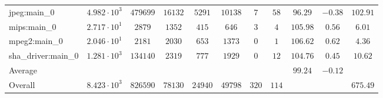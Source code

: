 \begin{tabular}{|l|c|c|c|c|c|c|c|c|c|c|}
jpeg:main\_0            & $ 4.982 \cdot 10^{3} $ & $ 479699 $ & $ 16132 $ & $ 5291  $ & $ 10138 $ & $ 7   $ & $ 58  $ & $ 96.29       $ & $ -0.38   $ & $ 102.91  $ \\
mips:main\_0            & $ 2.717 \cdot 10^{1} $ & $ 2879   $ & $ 1352  $ & $ 415   $ & $ 646   $ & $ 3   $ & $ 4   $ & $ 105.98      $ & $ 0.56    $ & $ 6.01    $ \\
mpeg2:main\_0           & $ 2.046 \cdot 10^{1} $ & $ 2181   $ & $ 2030  $ & $ 653   $ & $ 1373  $ & $ 0   $ & $ 1   $ & $ 106.62      $ & $ 0.62    $ & $ 4.36    $ \\
sha\_driver:main\_0     & $ 1.281 \cdot 10^{3} $ & $ 134140 $ & $ 2319  $ & $ 777   $ & $ 1929  $ & $ 0   $ & $ 12  $ & $ 104.76      $ & $ 0.45    $ & $ 10.62   $ \\
\hline
Average                 & $                    $ & $        $ & $       $ & $       $ & $       $ & $     $ & $     $ & $ 99.24       $ & $ -0.12   $ & $         $ \\
\hline
Overall                 & $ 8.423 \cdot 10^{3} $ & $ 826590 $ & $ 78130 $ & $ 24940 $ & $ 49798 $ & $ 320 $ & $ 114 $ & $             $ & $         $ & $ 675.49  $ \\
\hline
\end{tabular}
